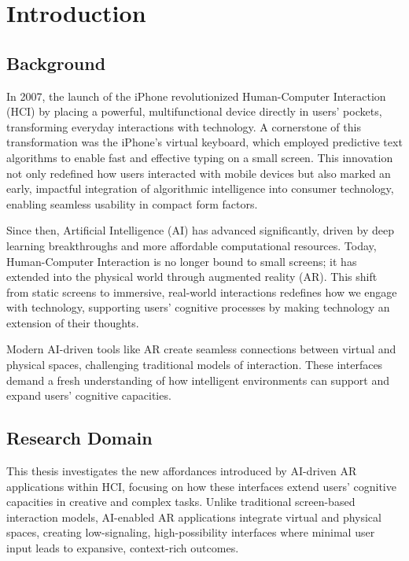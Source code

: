 
\section{Introduction}

\subsection{Background}

In 2007, the launch of the iPhone revolutionized Human-Computer Interaction (HCI) by placing a powerful, multifunctional device directly in users' pockets, transforming everyday interactions with technology.
A cornerstone of this transformation was the iPhone's virtual keyboard, which employed predictive text algorithms to enable fast and effective typing on a small screen.
This innovation not only redefined how users interacted with mobile devices but also marked an early, impactful integration of algorithmic intelligence into consumer technology, enabling seamless usability in compact form factors.

Since then, Artificial Intelligence (AI) has advanced significantly, driven by deep learning breakthroughs and more affordable computational resources.
Today, Human-Computer Interaction is no longer bound to small screens; it has extended into the physical world through augmented reality (AR).
This shift from static screens to immersive, real-world interactions redefines how we engage with technology, supporting users’ cognitive processes by making technology an extension of their thoughts.

Modern AI-driven tools like AR create seamless connections between virtual and physical spaces, challenging traditional models of interaction.
These interfaces demand a fresh understanding of how intelligent environments can support and expand users' cognitive capacities.


\subsection{Research Domain}

This thesis investigates the new affordances introduced by AI-driven AR applications within HCI, focusing on how these interfaces extend users' cognitive capacities in creative and complex tasks.
Unlike traditional screen-based interaction models, AI-enabled AR applications integrate virtual and physical spaces, creating low-signaling, high-possibility interfaces where minimal user input leads to expansive, context-rich outcomes.

